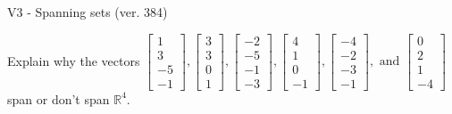 \begin{exercise}
  \begin{exerciseTitle}V3 - Spanning sets (ver. 384)\end{exerciseTitle}
  \begin{exerciseStatement}
    Explain why the vectors \(\left[\begin{array}{r}
1 \\
3 \\
-5 \\
-1
\end{array}\right] , \left[\begin{array}{r}
3 \\
3 \\
0 \\
1
\end{array}\right] , \left[\begin{array}{r}
-2 \\
-5 \\
-1 \\
-3
\end{array}\right] , \left[\begin{array}{r}
4 \\
1 \\
0 \\
-1
\end{array}\right] , \left[\begin{array}{r}
-4 \\
-2 \\
-3 \\
-1
\end{array}\right] , \text{ and } \left[\begin{array}{r}
0 \\
2 \\
1 \\
-4
\end{array}\right]\) span or don't span \(\mathbb{R}^4\). 
	



\end{exerciseStatement}
\end{exercise}
